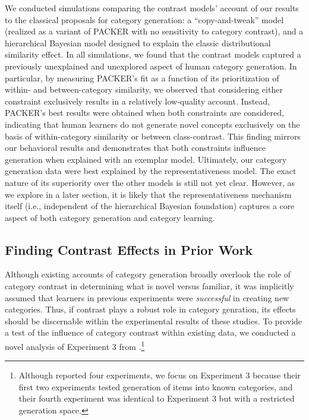 \documentclass[12pt]{article}
\begin{document}
\begin{flushleft}
We conducted simulations comparing the contrast models' account of our results
to the classical proposals for category generation: a ``copy-and-tweak'' model
(realized as a variant of PACKER with no sensitivity to category contrast), and
a hierarchical Bayesian model designed to explain the classic distributional
similarity effect. In all simulations, we found that the contrast models
captured a previously unexplained and unexplored aspect of human category
generation. In particular, by measuring PACKER's fit as a function of its
prioritization of within- and between-category similarity, we observed that
considering either constraint exclusively results in a relatively low-quality
account. Instead, PACKER's best results were obtained when both constraints are
considered, indicating that human learners do not generate novel concepts
exclusively on the basis of within-category similarity or between
class-contrast. This finding mirrors our behavioral results and demonstrates
that both constraints influence generation when explained with an exemplar
model. Ultimately, our category generation data were best explained by the
representativeness model. The exact nature of its superiority over the other
models is still not yet clear. However, as we explore in a later section, it is
likely that the representativeness mechanism itself (i.e., independent of the
hierarchical Bayesian foundation) captures a core aspect of both category
generation and category learning.

\subsection{Finding Contrast Effects in Prior Work}

Although existing accounts of category generation broadly overlook the role of
category contrast in determining what is novel versus familiar, it was
implicitly assumed that learners in previous experiments were {\em successful}
in creating new categories. Thus, if contrast plays a robust role in category
genration, its effects should be discernable within the experimental results of
these studies. To provide a test of the influence of category contrast within
existing data, we conducted a novel analysis of Experiment 3 from
\cite{jern2013probabilistic}.\footnote{Although \cite{jern2013probabilistic}
reported four experiments, we focus on Experiment 3 because their first two
experiments tested generation of items into known categories, and their fourth
experiment was identical to Experiment 3 but with a restricted generation
space.}


\end{flushleft}
\end{document}
